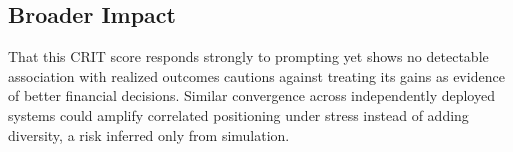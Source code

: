 \documentclass{article}
\begin{document}
\vspace{-6pt}
\subsection{Broader Impact}
\vspace{-6pt}
That this CRIT score responds strongly to prompting yet shows no detectable association with realized outcomes cautions against treating its gains as evidence of better financial decisions. Similar convergence across independently deployed systems could amplify correlated positioning under stress instead of adding diversity, a risk inferred only from simulation.




\end{document}
